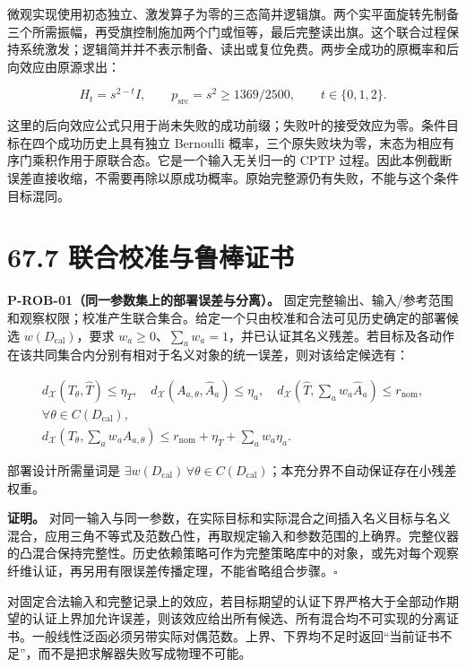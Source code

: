 \documentclass[
  11pt,
  oneside]{book}
\begin{document}
微观实现使用初态独立、激发算子为零的三态简并逻辑旗。两个实平面旋转先制备三个所需振幅，再受旗控制施加两个门或恒等，最后完整读出旗。这个联合过程保持系统激发；逻辑简并并不表示制备、读出或复位免费。两步全成功的原概率和后向效应由原源求出：

\[
H_t=s^{2-t}I,\qquad p_{\mathrm{src}}=s^2\ge1369/2500,
\qquad t\in\{0,1,2\}.
\]

这里的后向效应公式只用于尚未失败的成功前缀；失败叶的接受效应为零。条件目标在四个成功历史上具有独立
Bernoulli
概率，三个原失败块为零，末态为相应有序门乘积作用于原联合态。它是一个输入无关归一的
CPTP
过程。因此本例截断误差直接收缩，不需要再除以原成功概率。原始完整源仍有失败，不能与这个条件目标混同。

\section{67.7 联合校准与鲁棒证书}

\protect\hypertarget{p-rob-01}{}{}

\textbf{P-ROB-01（同一参数集上的部署误差与分离）。}
固定完整输出、输入/参考范围和观察权限；校准产生联合集合。给定一个只由校准和合法可见历史确定的部署候选
\(w(D_{\mathrm{cal}})\)，要求
\(w_a\ge0\)、\(\sum_a w_a=1\)，并已认证其名义残差。若目标及各动作在该共同集合内分别有相对于名义对象的统一误差，则对该给定候选有：

\[
\begin{gathered}
d_{\mathcal X}(T_\theta,\widehat T)\le\eta_T,\quad
d_{\mathcal X}(A_{a,\theta},\widehat A_a)\le\eta_a,\quad
d_{\mathcal X}(\widehat T,\sum_a w_a\widehat A_a)\le r_{\mathrm{nom}},\\
\forall\theta\in C(D_{\mathrm{cal}}),\\
d_{\mathcal X}\!\left(T_\theta,\sum_a w_aA_{a,\theta}\right)
\le r_{\mathrm{nom}}+\eta_T+\sum_a w_a\eta_a.
\end{gathered}
\]

部署设计所需量词是
\(\exists w(D_{\mathrm{cal}})\,\forall\theta\in C(D_{\mathrm{cal}})\)；本充分界不自动保证存在小残差权重。

\textbf{证明。}
对同一输入与同一参数，在实际目标和实际混合之间插入名义目标与名义混合，应用三角不等式及范数凸性，再取规定输入和参数范围的上确界。完整仪器的凸混合保持完整性。历史依赖策略可作为完整策略库中的对象，或先对每个观察纤维认证，再另用有限误差传播定理，不能省略组合步骤。\(\square\)

对固定合法输入和完整记录上的效应，若目标期望的认证下界严格大于全部动作期望的认证上界加允许误差，则该效应给出所有候选、所有混合均不可实现的分离证书。一般线性泛函必须另带实际对偶范数。上界、下界均不足时返回``当前证书不足''，而不是把求解器失败写成物理不可能。
\end{document}
